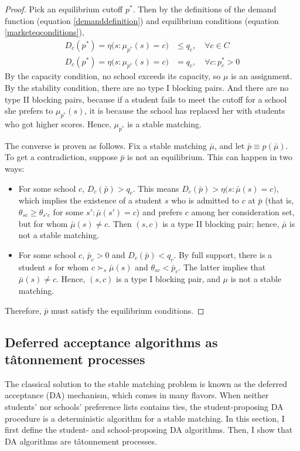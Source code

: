 \documentclass[12pt]{article}
\numberwithin{equation}{subsection}
\theoremstyle{definition}
\begin{document}
\begin{proof}Pick an equilibrium cutoff $p^*$. Then by the definitions of the demand function (equation \eqref{demanddefinition}) and equilibrium conditions (equation \eqref{marketeqconditions}), 
\begin{align*}
D_c(p^*) = \eta\bigl(s: \mu_{p^*}(s) = c\bigr) &\leq q_c, \quad\forall c \in C \\
D_c(p^*) = \eta\bigl(s: \mu_{p^*}(s) = c\bigr) &= q_c, \quad \forall c: p_c^* > 0 
\end{align*}
By the capacity condition, no school exceeds its capacity, so $\mu$ is an assignment. By the stability condition, there are no type I blocking pairs. And there are no type II blocking pairs, because if a student fails to meet the cutoff for a school she prefers to $\mu_{p^*}(s)$, it is because the school has replaced her with students who got higher scores. Hence, $\mu_{p^*}$ is a stable matching.

The converse is proven as follows. Fix a stable matching $\bar \mu$, and let $\bar p \equiv p(\bar \mu)$. To get a contradiction, suppose $\bar p$ is not an equilibrium. This can happen in two ways:
\begin{itemize}
\item For some school $c$, $D_c( \bar p) > q_c$. This means $D_c( \bar p)  >  \eta\bigl(s: \bar \mu(s) = c\bigr) $, which implies the existence of a student $s$ who is admitted to $c$ at $\bar p$ (that is, $\theta_{sc} \geq \theta_{s'c}$ for some $s': \bar \mu(s') = c$) and prefers $c$ among her consideration set, but for whom $\bar \mu(s) \neq c$. Then $(s, c)$ is a type II blocking pair; hence, $\bar \mu$ is not a stable matching.
\item For some school $c$, $\bar p_c > 0$ and $D_c(\bar p) < q_c$. By full support, there is a student $s$ for whom $c \succ_s \bar \mu(s)$ and $\theta_{sc} < \bar p_c$. The latter implies that $\bar \mu(s) \neq c$. Hence, $(s, c)$ is a type I blocking pair, and $\mu$ is not a stable matching. 
\end{itemize}
Therefore, $\bar p$ must satisfy the equilibrium conditions.
\end{proof}

\subsection{Deferred acceptance algorithms as t\^{atonnement} processes} \label{defaccaretat}
The classical solution to the stable matching problem is known as the deferred acceptance (DA) mechanism, which comes in many flavors. When neither students' nor schools' preference lists contains ties, the student-proposing DA procedure is a deterministic algorithm for a stable matching.  In this section, I first define the student- and school-proposing DA algorithms. Then, I show that DA algorithms are t\^{a}tonnement processes.
\end{document}
